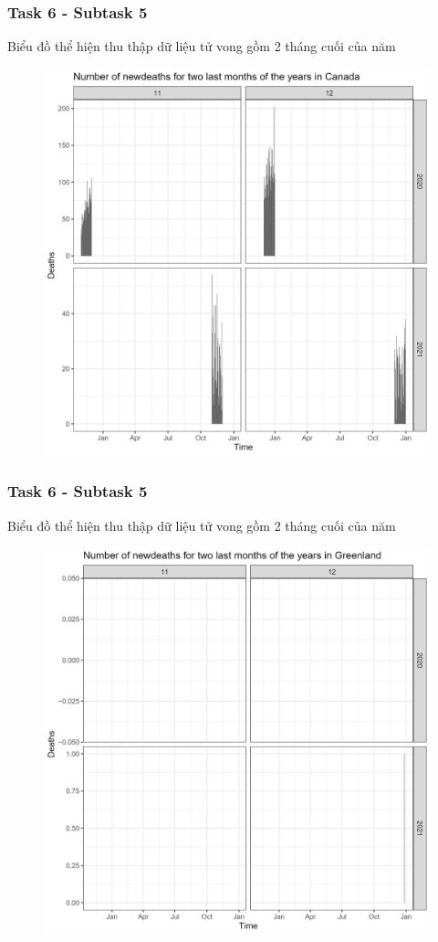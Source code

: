 \documentclass[english,10pt,table]{beamer}
\begin{document}
\frame
{
    \frametitle{Task 6 - Subtask 5}
    \begin{block}{Biểu đồ thể hiện thu thập dữ liệu tử vong gồm 2 tháng cuối của năm}
    \begin{figure}[H]
		\centering
		\includegraphics[scale=0.105]{images/6.5.1.png}
	\end{figure}
    \end{block}
}
\frame
{
    \frametitle{Task 6 - Subtask 5}
    \begin{block}{Biểu đồ thể hiện thu thập dữ liệu tử vong gồm 2 tháng cuối của năm}
    \begin{figure}[H]
		\centering
		\includegraphics[scale=0.105]{images/6.5.2.png}
	\end{figure}
    \end{block}
}
\end{document}
